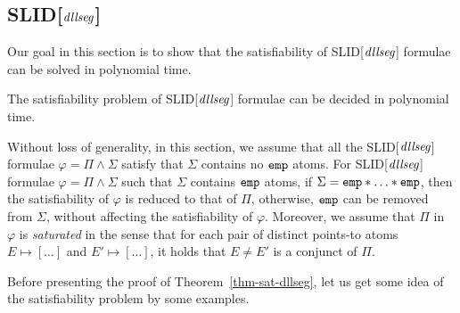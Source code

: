 \documentclass{llncs}
\begin{document}
\subsection{SLID[$\mathit{dllseg}$]}

Our goal in this section is to show that the satisfiability of SLID[$\mathit{dllseg}$] formulae can be solved in polynomial time.

\begin{theorem}\label{thm-sat-dllseg}
The satisfiability problem of SLID[$\mathit{dllseg}$] formulae can be decided in polynomial time.
\end{theorem}




Without loss of generality, in this section, we assume that all the SLID[$\mathit{dllseg}$] formulae $\varphi = \Pi \wedge \Sigma$ satisfy that $\Sigma$ contains no $\mathtt{emp}$ atoms. For SLID[$\mathit{dllseg}$] formulae $\varphi = \Pi \wedge \Sigma$ such that $\Sigma$ contains $\mathtt{emp}$ atoms, if $\Sigma = \slemp \sep \dots \sep \slemp$, then the satisfiability of $\varphi$ is reduced to that of $\Pi$, otherwise, $\mathtt{emp}$ can be removed from $\Sigma$, without affecting the satisfiability of $\varphi$. Moreover, we assume that $\Pi$ in $\varphi$ is \emph{saturated} in the sense that for each pair of distinct points-to atoms $E \mapsto [\dots]$ and $E' \mapsto [\dots]$, it holds that $E \neq E'$ is a conjunct of $\Pi$.

Before presenting the proof of Theorem~\ref{thm-sat-dllseg}, let us get some idea of the satisfiability problem by some examples.
\end{document}

